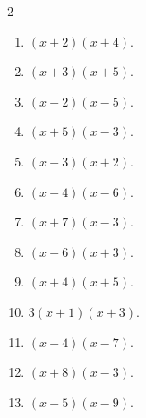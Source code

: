 \documentclass[11pt]{article}
\begin{document}
\begin{keybox}
\begin{multicols}{2}
\small
\begin{enumerate}[leftmargin=*,itemsep=3pt]
  \item $(x+2)(x+4)$.
  \item $(x+3)(x+5)$.
  \item $(x-2)(x-5)$.
  \item $(x+5)(x-3)$.
  \item $(x-3)(x+2)$.
  \item $(x-4)(x-6)$.
  \item $(x+7)(x-3)$.
  \item $(x-6)(x+3)$.
  \item $(x+4)(x+5)$.
  \item $3(x+1)(x+3)$.
  \item $(x-4)(x-7)$.
  \item $(x+8)(x-3)$.
  \item $(x-5)(x-9)$.
\end{enumerate}
\end{multicols}
\end{keybox}
\end{document}
